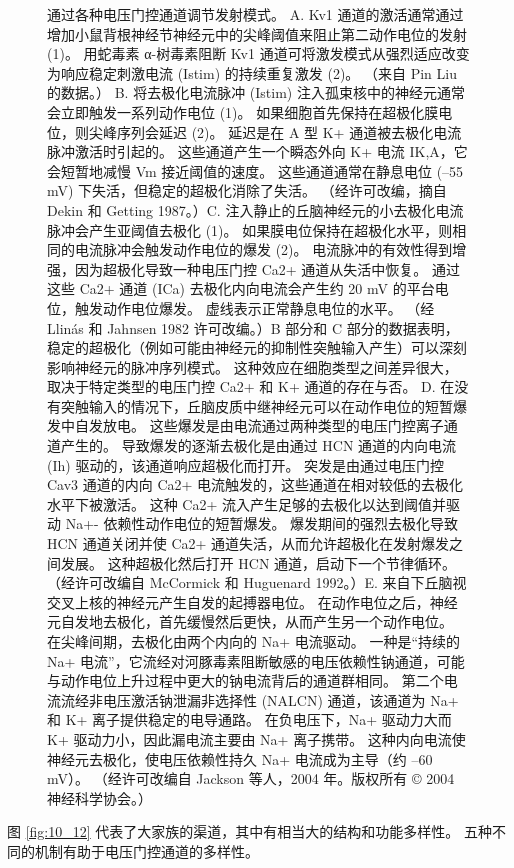 \begin{figure}[htbp]
	\caption{通过各种电压门控通道调节发射模式。 A. Kv1 通道的激活通常通过增加小鼠背根神经节神经元中的尖峰阈值来阻止第二动作电位的发射 (1)。 用蛇毒素 α-树毒素阻断 Kv1 通道可将激发模式从强烈适应改变为响应稳定刺激电流 (Istim) 的持续重复激发 (2)。 （来自 Pin Liu 的数据。） B. 将去极化电流脉冲 (Istim) 注入孤束核中的神经元通常会立即触发一系列动作电位 (1)。 如果细胞首先保持在超极化膜电位，则尖峰序列会延迟 (2)。 延迟是在 A 型 K+ 通道被去极化电流脉冲激活时引起的。 这些通道产生一个瞬态外向 K+ 电流 IK,A，它会短暂地减慢 Vm 接近阈值的速度。 这些通道通常在静息电位 (–55 mV) 下失活，但稳定的超极化消除了失活。 （经许可改编，摘自 Dekin 和 Getting 1987。）C. 注入静止的丘脑神经元的小去极化电流脉冲会产生亚阈值去极化 (1)。 如果膜电位保持在超极化水平，则相同的电流脉冲会触发动作电位的爆发 (2)。 电流脉冲的有效性得到增强，因为超极化导致一种电压门控 Ca2+ 通道从失活中恢复。 通过这些 Ca2+ 通道 (ICa) 去极化内向电流会产生约 20 mV 的平台电位，触发动作电位爆发。 虚线表示正常静息电位的水平。 （经 Llinás 和 Jahnsen 1982 许可改编。）B 部分和 C 部分的数据表明，稳定的超极化（例如可能由神经元的抑制性突触输入产生）可以深刻影响神经元的脉冲序列模式。 这种效应在细胞类型之间差异很大，取决于特定类型的电压门控 Ca2+ 和 K+ 通道的存在与否。 D. 在没有突触输入的情况下，丘脑皮质中继神经元可以在动作电位的短暂爆发中自发放电。 这些爆发是由电流通过两种类型的电压门控离子通道产生的。 导致爆发的逐渐去极化是由通过 HCN 通道的内向电流 (Ih) 驱动的，该通道响应超极化而打开。 突发是由通过电压门控 Cav3 通道的内向 Ca2+ 电流触发的，这些通道在相对较低的去极化水平下被激活。 这种 Ca2+ 流入产生足够的去极化以达到阈值并驱动 Na+- 依赖性动作电位的短暂爆发。 爆发期间的强烈去极化导致 HCN 通道关闭并使 Ca2+ 通道失活，从而允许超极化在发射爆发之间发展。 这种超极化然后打开 HCN 通道，启动下一个节律循环。 （经许可改编自 McCormick 和 Huguenard 1992。）E. 来自下丘脑视交叉上核的神经元产生自发的起搏器电位。 在动作电位之后，神经元自发地去极化，首先缓慢然后更快，从而产生另一个动作电位。 在尖峰间期，去极化由两个内向的 Na+ 电流驱动。 一种是“持续的 Na+ 电流”，它流经对河豚毒素阻断敏感的电压依赖性钠通道，可能与动作电位上升过程中更大的钠电流背后的通道群相同。 第二个电流流经非电压激活钠泄漏非选择性 (NALCN) 通道，该通道为 Na+ 和 K+ 离子提供稳定的电导通路。 在负电压下，Na+ 驱动力大而 K+ 驱动力小，因此漏电流主要由 Na+ 离子携带。 这种内向电流使神经元去极化，使电压依赖性持久 Na+ 电流成为主导（约 –60 mV）。 （经许可改编自 Jackson 等人，2004 年。版权所有 © 2004 神经科学协会。）}
	\label{fig:10_15}
\end{figure}


图 \ref{fig:10_12} 代表了大家族的渠道，其中有相当大的结构和功能多样性。 
五种不同的机制有助于电压门控通道的多样性。


